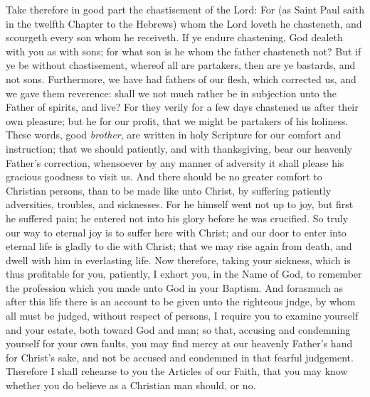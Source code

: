 Take therefore in good part the chastisement of the Lord: For (as Saint Paul saith in the twelfth Chapter to the Hebrews) whom the Lord loveth he chasteneth, and scourgeth every son whom he receiveth. If ye endure chastening, God dealeth with you as with sons; for what son is he whom the father chasteneth not? But if ye be without chastisement, whereof all are partakers, then are ye bastards, and not sons. Furthermore, we have had fathers of our flesh, which corrected us, and we gave them reverence: shall we not much rather be in subjection unto the Father of spirits, and live? For they verily for a few days chastened us after their own pleasure; but he for our profit, that we might be partakers of his holiness. These words, good \emph{brother}, are written in holy Scripture for our comfort and instruction; that we should patiently, and with thanksgiving, bear our heavenly Father’s correction, whensoever by any manner of adversity it shall please his gracious goodness to visit us. And there should be no greater comfort to Christian persons, than to be made like unto Christ, by suffering patiently adversities, troubles, and sicknesses. For he himself went not up to joy, but first he suffered pain; he entered not into his glory before he was crucified. So truly our way to eternal joy is to suffer here with Christ; and our door to enter into eternal life is gladly to die with Christ; that we may rise again from death, and dwell with him in everlasting life. Now therefore, taking your sickness, which is thus profitable for you, patiently, I exhort you, in the Name of God, to remember the profession which you made unto God in your Baptism. And forasmuch as after this life there is an account to be given unto the righteous judge, by whom all must be judged, without respect of persons, I require you to examine yourself and your estate, both toward God and man; so that, accusing and condemning yourself for your own faults, you may find mercy at our heavenly Father’s hand for Christ’s sake, and not be accused and condemned in that fearful judgement. Therefore I shall rehearse to you the Articles of our Faith, that you may know whether you do believe as a Christian man should, or no.

\medskip
{}

\medskip

